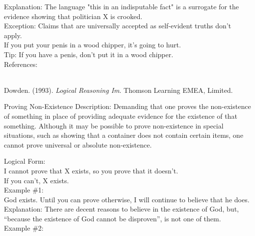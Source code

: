 \documentclass[a4paper,12pt,single,pdftex]{scrbook}
\begin{document}
    
      Explanation: The language "this in an indisputable fact" is a surrogate for the evidence showing that politician X is crooked.
    \\

    
      Exception: Claims that are universally accepted as self-evident truths don't apply.
    \\

    
      If you put your penis in a wood chipper, it's going to hurt.
    \\

    
      Tip: If you have a penis, don't put it in a wood chipper.
    \\

    References:

    
      
        
      \\

      
        
          Dowden. (1993). {\it Logical Reasoning Im}. Thomson Learning EMEA, Limited.
        
      
    
  

Proving Non-Existence
    Description: Demanding that one proves the non-existence of something in place of providing adequate evidence for the existence of that something.  Although it may be possible to prove non-existence in special situations, such as showing that a container does not contain certain items, one cannot prove universal or absolute non-existence.

    
      Logical Form:
    \\

    
      I cannot prove that X exists, so you prove that it doesn’t.
    \\

    
      If you can’t, X exists.
    \\

    
      Example \#1:
    \\

    
      God exists.  Until you can prove otherwise, I will continue to believe that he does.
    \\

    
      Explanation: There are decent reasons to believe in the existence of God, but, “because the existence of God cannot be disproven”, is not one of them.
    \\

    
      Example \#2:
    \\
\end{document}
